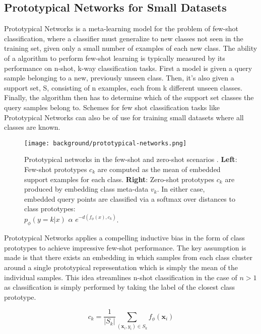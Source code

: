 \subsection{Prototypical Networks for Small Datasets}
\label{models:protonet}

Prototypical Networks \cite{protonet} is a meta-learning model for the problem of few-shot classification, where a classifier must generalize to new classes not seen in the training set, given only a small number of examples of each new class. The ability of a algorithm to perform few-shot learning is typically measured by its performance on n-shot, k-way classification tasks. First a model is given a query sample belonging to a new, previously unseen class. Then, it’s also given a support set, S, consisting of n examples, each from k different unseen classes. Finally, the algorithm then has to determine which of the support set classes the query samples belong to.
Schemes for few shot classification tasks like Prototypical Networks can also be of use for training small datasets where all classes are known.

\begin{figure}[H]
    \centering
        \texttt{[image: background/prototypical-networks.png]}
        \caption{Prototypical networks in the few-shot and zero-shot scenarios \cite{protonet}. \textbf{Left}: Few-shot prototypes $c_k$ are computed as the mean of embedded support examples for each class. \textbf{Right}: Zero-shot prototypes $c_k$ are produced by embedding class meta-data $v_k$. In either case, embedded query points are classified via a softmax over distances to class prototypes: \\ $p_{\phi}(y = k|x)$ $\alpha$ $e^{-d(f_{\phi}(x), c_k)}$.}
    \label{figure:background:prototypical}
\end{figure}

Prototypical Networks applies a compelling inductive bias in the form of class prototypes to achieve impressive few-shot performance. The key assumption is made is that there exists an embedding in which samples from each class cluster around a single prototypical representation which is simply the mean of the individual samples. This idea streamlines n-shot classification in the case of $n > 1$ as classification is simply performed by taking the label of the closest class prototype.

\begin{equation}
    c_k = \frac{1}{|S_k|} \sum_{(\mathbf{x}_i, y_i) \in S_k} f_{\phi}(\mathbf{x}_i)
\end{equation}

